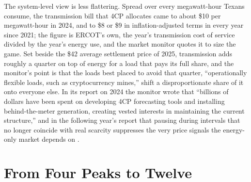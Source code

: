 The system-level view is less flattering. Spread over every megawatt-hour Texans consume, the transmission bill that 4CP allocates came to about \$10 per megawatt-hour in 2024, and to \$8 or \$9 in inflation-adjusted terms in every year since 2021; the figure is ERCOT's own, the year's transmission cost of service divided by the year's energy use, and the market monitor quotes it to size the game. %
Set beside the \$42 average settlement price of 2025, transmission adds roughly a quarter on top of energy for a load that pays its full share, and the monitor's point is that the loads best placed to avoid that quarter, ``operationally flexible loads, such as cryptocurrency mines,'' shift a disproportionate share of it onto everyone else. %
In its report on 2024 the monitor wrote that ``billions of dollars have been spent on developing 4CP forecasting tools and installing behind-the-meter generation, creating vested interests in maintaining the current structure,'' and in the following year's report that pausing during intervals that no longer coincide with real scarcity suppresses the very price signals the energy-only market depends on \autocite{potomac2024som,potomac2026somercot}. %

\section{From Four Peaks to Twelve}
\label{sec:twelvecp}

